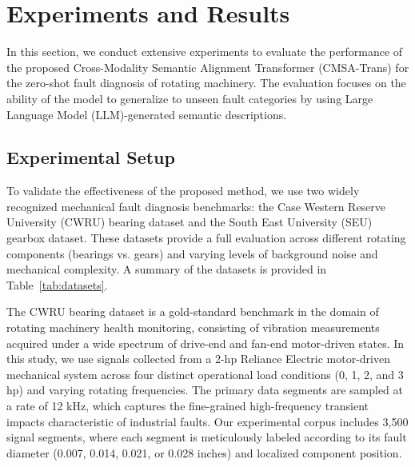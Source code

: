 \documentclass[journal]{IEEEtran}
\begin{document}
\section{Experiments and Results}
\label{sec:experiments}

In this section, we conduct extensive experiments to evaluate the performance of the proposed Cross-Modality Semantic Alignment Transformer (CMSA-Trans) for the zero-shot fault diagnosis of rotating machinery. The evaluation focuses on the ability of the model to generalize to unseen fault categories by using Large Language Model (LLM)-generated semantic descriptions.

\subsection{Experimental Setup}

To validate the effectiveness of the proposed method, we use two widely recognized mechanical fault diagnosis benchmarks: the Case Western Reserve University (CWRU) bearing dataset and the South East University (SEU) gearbox dataset. These datasets provide a full evaluation across different rotating components (bearings vs. gears) and varying levels of background noise and mechanical complexity. A summary of the datasets is provided in Table~\ref{tab:datasets}.



The CWRU bearing dataset is a gold-standard benchmark in the domain of rotating machinery health monitoring, consisting of vibration measurements acquired under a wide spectrum of drive-end and fan-end motor-driven states. In this study, we use signals collected from a 2-hp Reliance Electric motor-driven mechanical system across four distinct operational load conditions (0, 1, 2, and 3 hp) and varying rotating frequencies. The primary data segments are sampled at a rate of 12 kHz, which captures the fine-grained high-frequency transient impacts characteristic of industrial faults. Our experimental corpus includes 3,500 signal segments, where each segment is meticulously labeled according to its fault diameter (0.007, 0.014, 0.021, or 0.028 inches) and localized component position.
\end{document}
